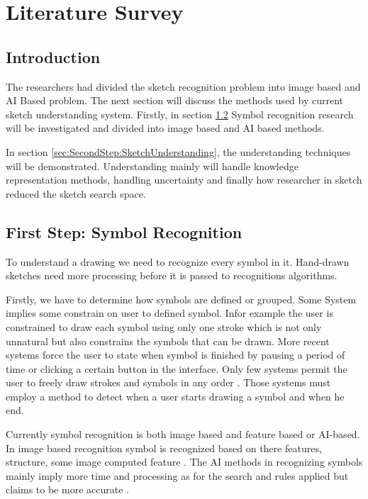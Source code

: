\chapter{Literature Survey}


\section{Introduction }
\label{sec:Introduction}


The researchers had divided the sketch recognition problem into image based and AI Based problem. The next section will discuss the methods used by current sketch understanding system. Firstly, in section \ref{sec:FirstStepSymbolRecognition} Symbol recognition research will be investigated and divided into image based and AI based methods.

 In section \ref{sec:SecondStep:SketchUnderstanding}, the understanding techniques will be demonstrated. Understanding mainly will handle knowledge representation methods, handling uncertainty and finally how researcher in sketch reduced the sketch search space.

\section{First Step: Symbol Recognition}
\label{sec:FirstStepSymbolRecognition}
 

To understand a drawing we need to recognize every symbol in it. Hand-drawn sketches need more processing before it is passed to recognitions algorithms.

 Firstly, we have to determine how symbols are defined or grouped. Some System implies some constrain on user to defined symbol. In\cite{gestureexample12,aideddesgin22,sketchinginterfaces2,sketchinginterfaces2,cognitivesketch18,ewhitboard9}for example the user is constrained to draw each symbol using only one stroke which is not only unnatural but also constrains the symbols that can be drawn. More recent systems force the user to state when symbol is finished by pausing a period of time or clicking a certain button in the interface. Only few systems permit the user to freely draw strokes and symbols in any order \cite{Vibratory8,visualpattern43,Cali63,statisticalparsing26,physicalmeaning6}. Those systems must employ a method to detect when a user starts drawing a symbol and when he end.
 
Currently symbol recognition is both image based and feature based or AI-based. In image based recognition symbol is recognized based on there features, structure, some image computed feature . The AI methods in recognizing symbols mainly imply more time and processing as for the search and rules applied but claims to be more accurate .



